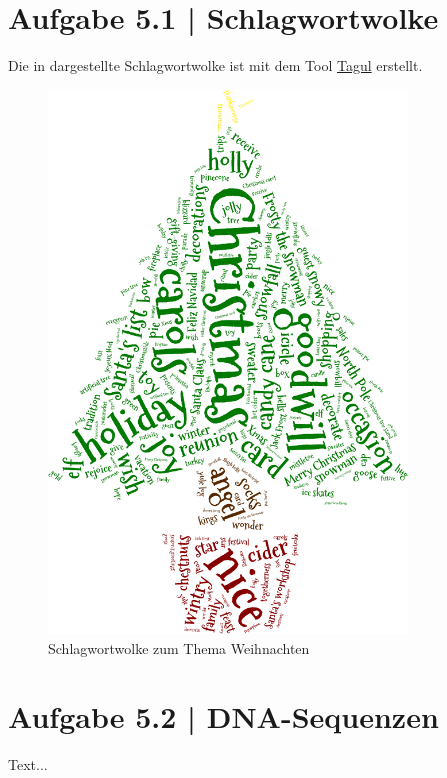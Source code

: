 \documentclass[a4paper,12pt,ngerman]{scrartcl}
\begin{document}
\pagestyle{fancy} %

\section{Aufgabe 5.1 | Schlagwortwolke}
Die in  dargestellte Schlagwortwolke ist mit dem Tool \href{https://tagul.com/}{Tagul} erstellt.

\begin{figure}[ht]
    \centering
    \includegraphics[width=0.85\textwidth]{includes/schlagwortwolke}
    \caption{Schlagwortwolke zum Thema Weihnachten}
    \label{fig:schlagwortwolke}
\end{figure}

\section{Aufgabe 5.2 | DNA-Sequenzen}
Text...
\end{document}
